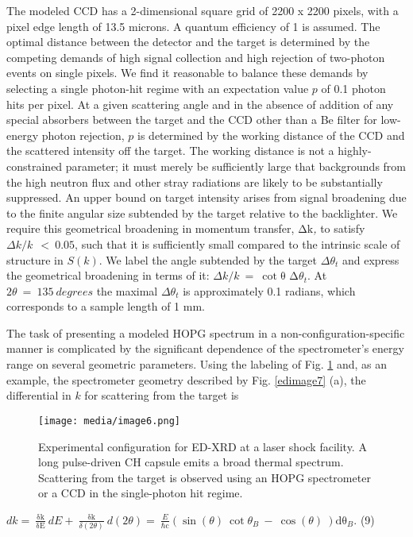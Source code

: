 The modeled CCD has a 2-dimensional square grid of 2200 x 2200 pixels,
with a pixel edge length of 13.5 microns. A quantum efficiency of 1 is
assumed. The optimal distance between the detector and the target is
determined by the competing demands of high signal collection and high
rejection of two-photon events on single pixels. We find it reasonable
to balance these demands by selecting a single photon-hit regime with an
expectation value \(p\) of 0.1 photon hits per pixel. At a given
scattering angle and in the absence of addition of any special absorbers
between the target and the CCD other than a Be filter for low-energy
photon rejection, \(p\) is determined by the working distance of the CCD
and the scattered intensity off the target. The working distance is not
a highly-constrained parameter; it must merely be sufficiently large
that backgrounds from the high neutron flux and other stray radiations
are likely to be substantially suppressed. An upper bound on target
intensity arises from signal broadening due to the finite angular size
subtended by the target relative to the backlighter. We require this
geometrical broadening in momentum transfer, \(\text{Δk}\)\emph{,} to
satisfy \(\Delta k/k\ \  < \ 0.05\), such that it is sufficiently small
compared to the intrinsic scale of structure in \(S(k)\). We label the
angle subtended by the target \(\Delta\theta_{t}\) and express the
geometrical broadening in terms of it:
\(\Delta k/k\  = \ \cot{\text{θ\ Δ}\theta_{t}}.\) At
\(2\theta\  = \ 135\ degrees\) the maximal \(\Delta\theta_{t}\) is
approximately 0.1 radians, which corresponds to a sample length of 1 mm.

The task of presenting a modeled HOPG spectrum in a
non-configuration-specific manner is complicated by the significant
dependence of the spectrometer's energy range on several geometric
parameters. Using the labeling of Fig. \ref{edimage6} and, as an example, the
spectrometer geometry described by Fig. \ref{edimage7} (a), the differential in \(k\)
for scattering from the target is

\begin{figure}[h] \label{edimage6}
\caption{ Experimental configuration
for ED-XRD at a laser shock facility. A long pulse-driven CH capsule
emits a broad thermal spectrum. Scattering from the target is observed
using an HOPG spectrometer or a CCD in the single-photon hit regime.}
\centering
\texttt{[image: media/image6.png]}
\end{figure}

\(dk = \ \frac{\text{δk}}{\text{δE}}\ dE + \ \frac{\text{δk}}{\delta(2\theta)}\ d(2\theta) = \ \frac{E}{\text{ℏc}}\left( \sin{(\theta)\ \cot{\theta_{B}\  - \ \cos{(\theta)}}}\  \right)\text{dθ}_{B}\).
(9)

